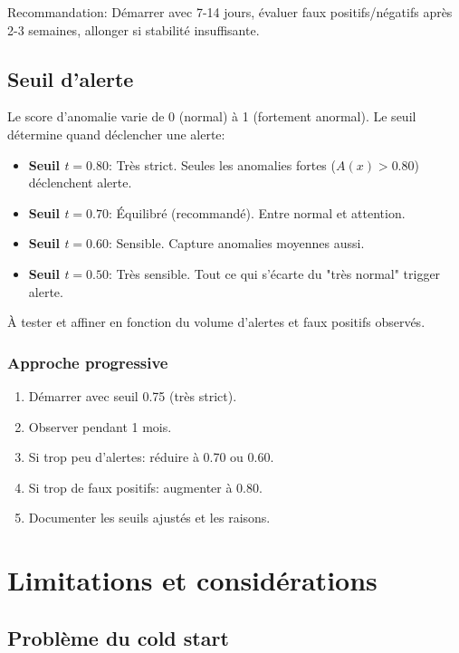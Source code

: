 Recommandation: Démarrer avec 7-14 jours, évaluer faux positifs/négatifs après 2-3 semaines, allonger si stabilité insuffisante.

\subsection{Seuil d'alerte}

Le score d'anomalie varie de 0 (normal) à 1 (fortement anormal). Le seuil détermine quand déclencher une alerte:

\begin{itemize}
	\item \textbf{Seuil $t = 0.80$}: Très strict. Seules les anomalies fortes ($A(x) > 0.80$) déclenchent alerte.
	
	\item \textbf{Seuil $t = 0.70$}: Équilibré (recommandé). Entre normal et attention.
	
	\item \textbf{Seuil $t = 0.60$}: Sensible. Capture anomalies moyennes aussi.
	
	\item \textbf{Seuil $t = 0.50$}: Très sensible. Tout ce qui s'écarte du "très normal" trigger alerte.
\end{itemize}

À tester et affiner en fonction du volume d'alertes et faux positifs observés.

\subsubsection{Approche progressive}

\begin{enumerate}
	\item Démarrer avec seuil 0.75 (très strict).
	\item Observer pendant 1 mois.
	\item Si trop peu d'alertes: réduire à 0.70 ou 0.60.
	\item Si trop de faux positifs: augmenter à 0.80.
	\item Documenter les seuils ajustés et les raisons.
\end{enumerate}

\section{Limitations et considérations}

\subsection{Problème du cold start}

